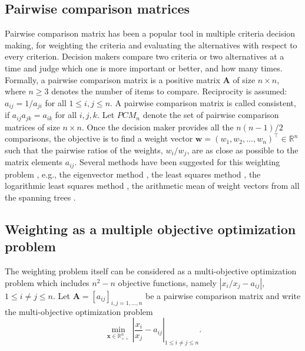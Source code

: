 \documentclass{article}
\theoremstyle{plain}
\begin{document}
\subsection{Pairwise comparison matrices}
Pairwise comparison matrix \cite{Saaty1977} has been a popular tool in multiple criteria decision making,
for weighting the criteria and evaluating the alternatives with respect to every criterion. Decision makers
compare two criteria or two alternatives at a time and judge which one is more important or better, and how many times.
Formally, a pairwise comparison matrix is a positive matrix $\mathbf{A}$ of size $n \times n$, where $n \geq 3$ denotes
the number of items to compare. Reciprocity is assumed: $a_{ij} = 1/a_{ji}$ for all $1 \leq i,j \leq n.$
A pairwise comparison matrix is called consistent, if $a_{ij} a_{jk} = a_{ik} $ for all $i,j,k.$
Let $PCM_n$ denote the set of pairwise comparison matrices of size $n \times n.$
Once the decision maker provides all the $n(n-1)/2$ comparisons, the objective is to f{\kern0pt}ind a weight
vector $\mathbf{w}=(w_1, w_2, \ldots, w_n)^{\top} \in \mathbb{R}^n$ such that the pairwise ratios of
the weights, $w_i/w_j$, are as close as possible to the matrix elements $a_{ij}$.
Several methods have been suggested for this weighting problem \cite{ChooWedley,GolanyKress1993},
e.g.,
the eigenvector method \cite{Saaty1977},
the least squares method \cite{ChuKalabaSpingarn1979},
the logarithmic least squares method \cite{CrawfordWilliams1980,CrawfordWilliams1985,De Graan1980},
the arithmetic mean of weight vectors from all the spanning trees
\cite{SirajMikhailovKeane2012a,SirajMikhailovKeane2012b,Tsyganok2000,Tsyganok2010}.


\subsection{Weighting as a multiple objective optimization problem}

The weighting problem itself can be considered as
a multi-objective optimization problem which includes $n^2-n$ objective functions,
namely $\left| x_i/x_j - a_{ij}  \right|$, $1 \leq i \neq j \leq n.$
Let  $\mathbf{A} = \left[ a_{ij} \right]_{i,j=1,\ldots,n}$
be a pairwise comparison matrix and write the multi-objective optimization
problem
\begin{equation}
\min\limits_{\mathbf{x} \in \mathbb{R}^n_{++}}
\left| \frac{x_i}{x_j} - a_{ij}  \right|_{1 \leq i \neq j \leq n}. \label{eq:xMultiObjectiveOptimizationProblem} %
\end{equation}
\end{document}
